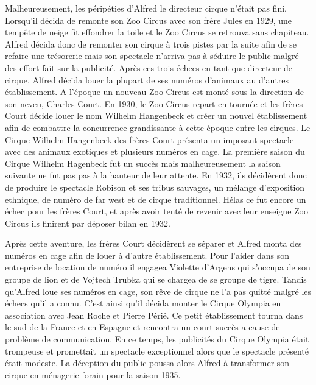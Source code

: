 Malheureusement, les péripéties d’Alfred le directeur cirque n’était pas fini. Lorsqu’il décida de remonte son Zoo Circus avec son frère Jules en 1929, une tempête de neige fit effondrer la toile et le Zoo Circus se retrouva sans chapiteau. Alfred décida donc de remonter son cirque à trois pistes par la suite afin de se refaire une trésorerie mais son spectacle n’arriva pas à séduire le public malgré des effort fait sur la publicité.
Après ces trois échecs en tant que directeur de cirque, Alfred décida louer la plupart de ses numéros d’animaux au d’autres établissement. A l’époque un nouveau Zoo Circus est monté sous la direction de son neveu, Charles Court. En 1930, le Zoo Circus repart en tournée et les frères Court décide louer le nom Wilhelm Hangenbeck et créer un nouvel établissement afin de combattre la concurrence grandissante à cette époque entre les cirques. Le Cirque Wilhelm Hangenbeck des frères Court présenta un imposant spectacle avec des animaux exotiques et plusieurs numéros en cage. La première saison du Cirque Wilhelm Hagenbeck fut un succès mais malheureusement la saison suivante ne fut pas pas à la hauteur de leur attente. En 1932, ils décidèrent donc de produire le spectacle Robison et ses tribus sauvages, un mélange d’exposition ethnique, de numéro de far west et de cirque traditionnel. Hélas ce fut encore un échec pour les frères Court, et après avoir tenté de revenir avec leur enseigne Zoo Circus ils finirent par déposer bilan en 1932.

Après cette aventure, les frères Court décidèrent se séparer et Alfred monta des numéros en cage afin de louer à d’autre établissement. Pour l’aider dans son entreprise de location de numéro il engagea Violette d’Argens qui s’occupa de son groupe de lion et de Vojtech Trubka qui se chargea de se groupe de tigre. Tandis qu’Alfred loue ses numéros en cage, son rêve de cirque ne l’a pas quitté malgré les échecs qu’il a connu. C’est ainsi qu’il décida monter le Cirque Olympia en association avec Jean Roche et Pierre Périé. Ce petit établissement tourna dans le sud de la France et en Espagne et rencontra un court succès a cause de problème de communication. En ce temps, les publicités du Cirque Olympia était trompeuse et promettait un spectacle exceptionnel alors que le spectacle présenté était modeste. La déception du public poussa alors Alfred à transformer son cirque en ménagerie forain pour la saison 1935.

